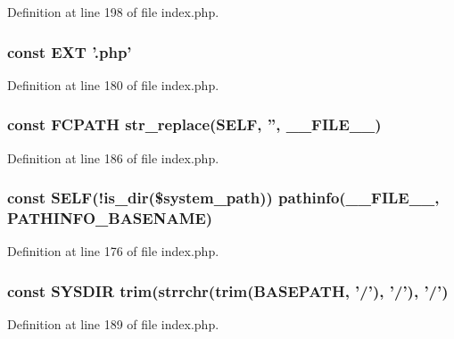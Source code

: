 Definition at line 198 of file index.\-php.

\hypertarget{index_8php_ad48706cc82e010be85f1398fb34c6510}{
\subsubsection[{E\-X\-T}]{\setlength{\rightskip}{0pt plus 5cm}const E\-X\-T '.php'}}\label{index_8php_ad48706cc82e010be85f1398fb34c6510}


Definition at line 180 of file index.\-php.

\hypertarget{index_8php_ae486546e58b2603595efedf9f95b3926}{
\subsubsection[{F\-C\-P\-A\-T\-H}]{\setlength{\rightskip}{0pt plus 5cm}const F\-C\-P\-A\-T\-H str\-\_\-replace({\bf S\-E\-L\-F}, '', \-\_\-\-\_\-\-F\-I\-L\-E\-\_\-\-\_\-)}}\label{index_8php_ae486546e58b2603595efedf9f95b3926}


Definition at line 186 of file index.\-php.

\hypertarget{index_8php_a428c045e64680e1582ba74161e441a1c}{
\subsubsection[{S\-E\-L\-F}]{\setlength{\rightskip}{0pt plus 5cm}const S\-E\-L\-F(!is\-\_\-dir(\$system\-\_\-path)) pathinfo(\-\_\-\-\_\-\-F\-I\-L\-E\-\_\-\-\_\-, P\-A\-T\-H\-I\-N\-F\-O\-\_\-\-B\-A\-S\-E\-N\-A\-M\-E)}}\label{index_8php_a428c045e64680e1582ba74161e441a1c}


Definition at line 176 of file index.\-php.

\hypertarget{index_8php_ab645ae0961792b1f2b4b83f89cb95fa5}{
\subsubsection[{S\-Y\-S\-D\-I\-R}]{\setlength{\rightskip}{0pt plus 5cm}const S\-Y\-S\-D\-I\-R trim(strrchr(trim({\bf B\-A\-S\-E\-P\-A\-T\-H}, '/'), '/'), '/')}}\label{index_8php_ab645ae0961792b1f2b4b83f89cb95fa5}


Definition at line 189 of file index.\-php.

